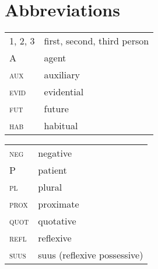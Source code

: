 \documentclass[output=paper]{LSP/langsci}
\begin{document}
\section*{Abbreviations}
\begin{tabularx}{.45\textwidth}{lX}
1, 2, 3 & first, second, third person\\
A & agent\\
\textsc{aux} & auxiliary \\
 \textsc{evid} & evidential \\
 \textsc{fut} & future \\
 \textsc{hab} & habitual \\
\end{tabularx}
\begin{tabularx}{.5\textwidth}{lX}
 \textsc{neg} & negative \\
 P & patient\\
 \textsc{pl} & plural \\
 \textsc{prox} & proximate \\
 \textsc{quot} & quotative \\
 \textsc{refl} & reflexive \\
 \textsc{suus} & suus (reflexive possessive)\\
\end{tabularx}
 

{\sloppy
\printbibliography[heading=subbibliography,notkeyword=this]
}
\end{document}
